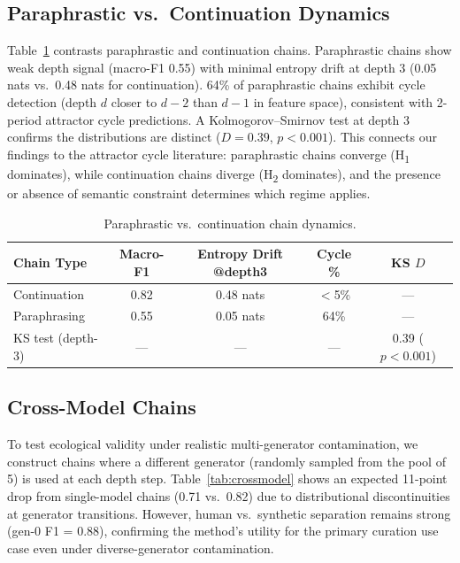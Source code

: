 \documentclass[letterpaper]{article}
\newcommand{\htwo}{H\textsubscript{2}}
\newcommand{\hone}{H\textsubscript{1}}
\begin{document}
\subsection{Paraphrastic vs.\ Continuation Dynamics}
\label{sec:para}

Table~\ref{tab:para} contrasts paraphrastic and continuation chains.
Paraphrastic chains show weak depth signal (macro-F1 0.55) with minimal entropy drift at depth 3 (0.05 nats vs.\ 0.48 nats for continuation).
64\% of paraphrastic chains exhibit cycle detection (depth $d$ closer to $d{-}2$ than $d{-}1$ in feature space), consistent with 2-period attractor cycle predictions.
A Kolmogorov--Smirnov test at depth 3 confirms the distributions are distinct ($D{=}0.39$, $p{<}0.001$).
This connects our findings to the attractor cycle literature: paraphrastic chains converge (\hone{} dominates), while continuation chains diverge (\htwo{} dominates), and the presence or absence of semantic constraint determines which regime applies.

\begin{table}[t]
\centering
\caption{Paraphrastic vs.\ continuation chain dynamics.}
\label{tab:para}
\begin{tabular}{lcccc}
\toprule
Chain Type & Macro-F1 & Entropy Drift @depth3 & Cycle \% & KS $D$ \\
\midrule
Continuation & 0.82 & 0.48 nats & $<$5\% & --- \\
Paraphrasing & 0.55 & 0.05 nats & 64\% & --- \\
KS test (depth-3) & --- & --- & --- & 0.39 ($p{<}0.001$) \\
\bottomrule
\end{tabular}
\end{table}

\subsection{Cross-Model Chains}
\label{sec:crossmodel}

To test ecological validity under realistic multi-generator contamination, we construct chains where a different generator (randomly sampled from the pool of 5) is used at each depth step.
Table~\ref{tab:crossmodel} shows an expected 11-point drop from single-model chains (0.71 vs.\ 0.82) due to distributional discontinuities at generator transitions.
However, human vs.\ synthetic separation remains strong (gen-0 F1 = 0.88), confirming the method's utility for the primary curation use case even under diverse-generator contamination.
\end{document}
